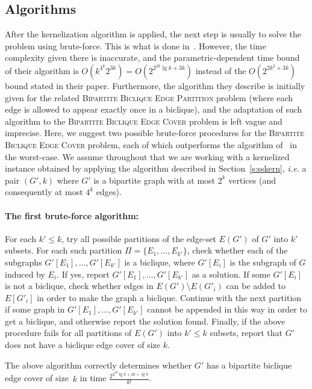 \subsection{Algorithms}\label{s:sssa}

After the kernelization algorithm is applied, the next step
is usually to solve the problem using brute-force. This is what is done
in~\cite{FleischnerMujuniPaulusmaSzeider2009}. However, the
time complexity given there is inaccurate, and the
parametric-dependent time bound of their algorithm is
$O(k^{4^k}2^{3k})=O(2^{2^{2k}\lg k+3k})$ instead of the $O(2^{2k^2+3k})$ bound 
stated in their paper. Furthermore, the algorithm they describe is
initially given for the related \textsc{Bipartite Biclique Edge
  Partition} problem (where each edge is allowed to appear exactly once in a
biclique), and the adaptation of such algorithm to the \textsc{Bipartite Biclique
Edge Cover} problem is left vague and imprecise.
Here, we suggest two possible brute-force procedures for the \textsc{Bipartite Biclique
Edge Cover} problem, each of which outperforms the algorithm
of~\cite{FleischnerMujuniPaulusmaSzeider2009} in the worst-case. We assume
throughout that we are working
with a kernelized instance obtained by applying the algorithm described in Section~\ref{s:sskern}, \emph{i.e.} a pair $(G',k)$ where $G'$ is a bipartite graph with
at most $2^k$ vertices (and consequently at most $4^k$ edges).

\paragraph{The first brute-force algorithm:}
For each $k' \leq k$, try all possible partitions of the
edge-set $E(G')$ of $G'$ into $k'$ subsets. For each such
partition $\Pi =\{E_1,\ldots,E_{k'}\}$, check whether each of the
subgraphs $G'[E_1],\ldots,G'[E_{k'}]$ is a biclique, where
$G'[E_i]$ is the subgraph of $G$ induced by $E_i$. If yes, report
$G'[E_1],\ldots,G'[E_{k'}]$ as a solution. If some $G'[E_i]$ is
not a biclique, check whether edges in $E(G') \setminus E(G'_i)$
can be added to $E[G'_i]$ in order to make the graph a biclique.
Continue with the next partition if some graph in
$G'[E_1],\ldots,G'[E_{k'}]$ cannot be appended in this way in
order to get a biclique, and otherwise report the solution
found. Finally, if the above procedure fails for all partitions
of $E(G')$ into $k' \leq k$ subsets, report that $G'$ does not have a
biclique edge cover of size $k$.

\begin{lemma}
\label{Lemma: Correctness}
The above algorithm correctly determines whether $G'$ has a
bipartite biclique edge cover of size~$k$ in time
$\frac{2^{2^{2k}\lg k+2k+\lg k}}{k!}$.
\end{lemma}

